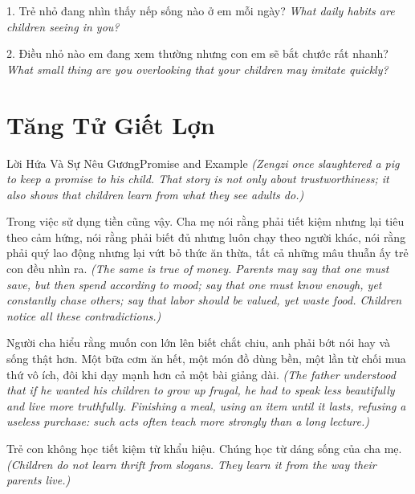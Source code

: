 \begin{tuhocnhanh}
1. Trẻ nhỏ đang nhìn thấy nếp sống nào ở em mỗi ngày? \textit{What daily habits are children seeing in you?}

2. Điều nhỏ nào em đang xem thường nhưng con em sẽ bắt chước rất nhanh? \textit{What small thing are you overlooking that your children may imitate quickly?}
\end{tuhocnhanh}
\ngancach

\section{Tăng Tử Giết Lợn}
\begin{truyen}{Lời Hứa Và Sự Nêu Gương}{Promise and Example}
\textit{(Zengzi once slaughtered a pig to keep a promise to his child. That story is not only about trustworthiness; it also shows that children learn from what they see adults do.)}

Trong việc sử dụng tiền cũng vậy. Cha mẹ nói rằng phải tiết kiệm nhưng lại tiêu theo cảm hứng, nói rằng phải biết đủ nhưng luôn chạy theo người khác, nói rằng phải quý lao động nhưng lại vứt bỏ thức ăn thừa, tất cả những mâu thuẫn ấy trẻ con đều nhìn ra.
\textit{(The same is true of money. Parents may say that one must save, but then spend according to mood; say that one must know enough, yet constantly chase others; say that labor should be valued, yet waste food. Children notice all these contradictions.)}

Người cha hiểu rằng muốn con lớn lên biết chắt chiu, anh phải bớt nói hay và sống thật hơn. Một bữa cơm ăn hết, một món đồ dùng bền, một lần từ chối mua thứ vô ích, đôi khi dạy mạnh hơn cả một bài giảng dài.
\textit{(The father understood that if he wanted his children to grow up frugal, he had to speak less beautifully and live more truthfully. Finishing a meal, using an item until it lasts, refusing a useless purchase: such acts often teach more strongly than a long lecture.)}
\end{truyen}

\begin{baihoc}
Trẻ con không học tiết kiệm từ khẩu hiệu. Chúng học từ dáng sống của cha mẹ.
\textit{(Children do not learn thrift from slogans. They learn it from the way their parents live.)}
\end{baihoc}

